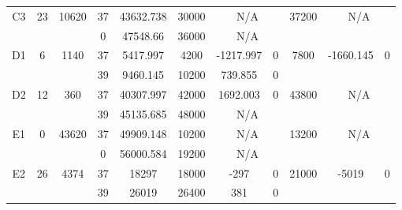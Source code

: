 \begin{sidewaystable}
\begin{tabular}{c||c|c||c|c|c|c|c||c|c|c}
         &
        
      \\
      \hline
      \multirow{2}{*}{C3} &
      \multirow{2}{*}{23} &
      \multirow{2}{*}{10620} &
      37 &
      43632.738 &
      30000 &
        \multicolumn{2}{|c||}{N/A} &
      \multirow{2}{*}{37200} &
        \multicolumn{2}{c}{\multirow{2}{*}{N/A}}
      \\
      \cline{4-8}
       &
       &
       &
      0 &
      47548.66 &
      36000 &
        \multicolumn{2}{|c||}{N/A} &
      
        
      \\
      \hline
      \multirow{2}{*}{D1} &
      \multirow{2}{*}{6} &
      \multirow{2}{*}{1140} &
      37 &
      5417.997 &
      4200 &
        -1217.997 &
        0 &
      \multirow{2}{*}{7800} &
        \multirow{2}{*}{-1660.145} &
        \multirow{2}{*}{0}
      \\
      \cline{4-8}
       &
       &
       &
      39 &
      9460.145 &
      10200 &
        739.855 &
        0 &
      
         &
        
      \\
      \hline
      \multirow{2}{*}{D2} &
      \multirow{2}{*}{12} &
      \multirow{2}{*}{360} &
      37 &
      40307.997 &
      42000 &
        1692.003 &
        0 &
      \multirow{2}{*}{43800} &
        \multicolumn{2}{c}{\multirow{2}{*}{N/A}}
      \\
      \cline{4-8}
       &
       &
       &
      39 &
      45135.685 &
      48000 &
        \multicolumn{2}{|c||}{N/A} &
      
        
      \\
      \hline
      \multirow{2}{*}{E1} &
      \multirow{2}{*}{0} &
      \multirow{2}{*}{43620} &
      37 &
      49909.148 &
      10200 &
        \multicolumn{2}{|c||}{N/A} &
      \multirow{2}{*}{13200} &
        \multicolumn{2}{c}{\multirow{2}{*}{N/A}}
      \\
      \cline{4-8}
       &
       &
       &
      0 &
      56000.584 &
      19200 &
        \multicolumn{2}{|c||}{N/A} &
      
        
      \\
      \hline
      \multirow{2}{*}{E2} &
      \multirow{2}{*}{26} &
      \multirow{2}{*}{4374} &
      37 &
      18297 &
      18000 &
        -297 &
        0 &
      \multirow{2}{*}{21000} &
        \multirow{2}{*}{-5019} &
        \multirow{2}{*}{0}
      \\
      \cline{4-8}
       &
       &
       &
      39 &
      26019 &
      26400 &
        381 &
        0 &
      

\end{tabular}
\end{sidewaystable}

